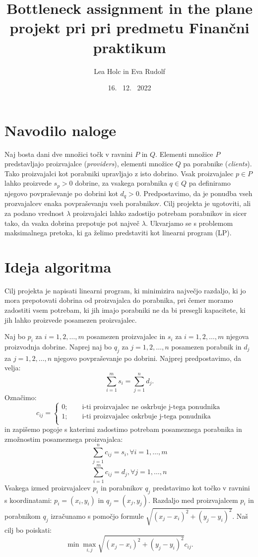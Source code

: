 \documentclass[a4paper, pt14]{article}
\begin{document}
\title{%
  Bottleneck assignment in the plane \\
  \large projekt pri pri predmetu Finančni praktikum}
\author{Lea Holc in Eva Rudolf}
\date{16. \ 12. \ 2022}

\maketitle

\section{Navodilo naloge}
Naj bosta dani dve množici točk v ravnini $P$ in $Q$. Elementi množice $P$ predstavljajo proizvajalce (\textsl{providers}), elementi množice $Q$ pa porabnike (\textsl{clients}). Tako proizvajalci kot porabniki upravljajo z isto dobrino. Vsak proizvajalec $p \in P$ lahko proizvede $s_p > 0$ dobrine, za vsakega porabnika $q \in Q$ pa definiramo njegovo povpraševanje po dobrini kot $d_q > 0$. Predpostavimo, da je ponudba vseh prozvajalcev enaka povpraševanju vseh porabnikov. Cilj projekta je ugotoviti, ali za podano vrednost $\lambda$ proizvajalci lahko zadostijo potrebam porabnikov in sicer tako, da vsaka dobrina prepotuje pot največ $\lambda$. Ukvarjamo se s problemom maksimalnega pretoka, ki ga želimo predstaviti kot linearni program (LP).

\section{Ideja algoritma}
Cilj projekta je napisati linearni program, ki minimizira največjo razdaljo, ki jo mora prepotovati dobrina od proizvajalca do porabnika, pri čemer moramo zadostiti vsem potrebam, ki jih imajo porabniki ne da bi presegli kapacitete, ki jih lahko proizvede posamezen proizvajalec. 

Naj bo $p_i$ za $i=1,2,\dots,m$ posamezen proizvajalec in $s_i$ za $i=1,2,\dots,m$ njegova proizvodnja dobrine. Naprej naj bo $q_j$ za $j=1,2,\dots,n$ posamezen porabnik in $d_j$ za $j=1,2,\dots,n$ njegovo povpraševanje po dobrini. Najprej predpostavimo, da velja:
$$
\sum_{i=1}^m s_i = \sum_{j=1}^n d_j.
$$ 
Označimo: 
$$
c_{ij} = 
\begin{cases}
    0;\qquad \textrm{i-ti proizvajalec ne oskrbuje j-tega ponudnika} \\
    1;\qquad \textrm{i-ti proizvajalec oskrbuje j-tega ponudnika} \\
\end{cases} 
$$
in zapišemo pogoje s katerimi zadostimo potrebam posameznega porabnika in zmožnostim posameznega proizvajalca:
$$
\sum_{j=1}^n c_{ij} = s_i, \forall i = 1,\dots,m 
$$
$$
\sum_{i=1}^m c_{ij} = d_j, \forall j = 1,\dots,n 
$$
Vsakega izmed proizvajalcev $p_i$ in porabnikov $q_j$ predstavimo kot točko v ravnini s koordinatami: $p_i = (x_i,y_i)$ in $q_j = (x_j,y_j)$. Razdaljo med proizvajalcem $p_i$ in porabnikom $q_j$ izračunamo s pomočjo formule $\sqrt{(x_j-x_i)^2 + (y_j-y_i)^2}$. Naš cilj bo poiskati:
$$
\min \max_{i,j} \sqrt{(x_j-x_i)^2 + (y_j-y_i)^2}c_{ij}.
$$
\end{document}
